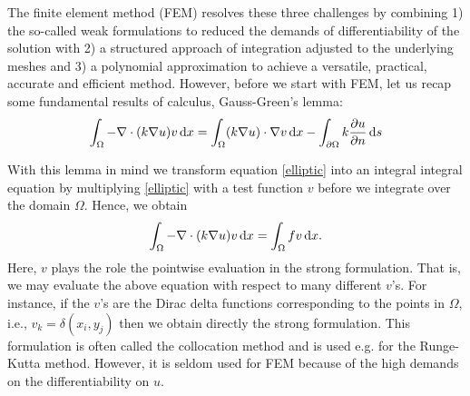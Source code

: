 The finite element method (FEM) resolves these three challenges by combining 1) the so-called weak formulations
to reduced the demands of differentiability of the solution with 2) a structured approach of integration
adjusted to the underlying meshes and 3) a polynomial approximation to achieve a versatile, practical, accurate
and efficient method. However, before we start with FEM, let us recap some fundamental results of calculus, 
Gauss-Green's lemma: 
\begin{equation}
\label{gaussgreen}
\int_\Omega 
-\nabla\cdot(k\nabla u) v \, \mathrm{d}x =  
\int_\Omega (k\nabla u) \cdot \nabla v \, \mathrm{d}x  - \int_{\partial \Omega} k\frac{\partial u} {\partial n} \, \mathrm{d}s 
\end{equation}

With this lemma in mind we transform equation \eqref{elliptic} into an integral integral equation by multiplying
\eqref{elliptic} with a test function $v$ before we integrate over the domain $\Omega$. Hence, 
we obtain  
\begin{equation}
\label{gaussgreen}
\int_\Omega -\nabla\cdot(k\nabla u) v \, \mathrm{d}x =  \int_\Omega f v \, \mathrm{d}x .  
\end{equation}
Here, $v$ plays the role the pointwise evaluation in the strong formulation. That is,
we may evaluate the above equation with respect to many different $v$'s. 
For instance, if the $v$'s are the Dirac delta functions corresponding to the points in $\Omega$, i.e.,  $v_k = \delta(x_i, y_j)$
then we obtain directly the strong formulation. This formulation is often called
the collocation method and is used e.g. for the Runge-Kutta method. However, it is 
seldom used for FEM because of the high demands on the differentiability on $u$. 

